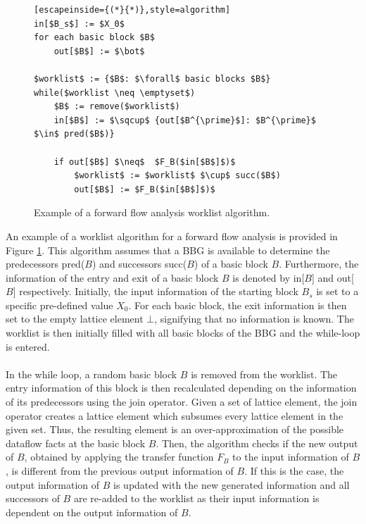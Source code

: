 \documentclass{kththesis}
\begin{document}
\clearpage
\begin{figure}[t]
    \centering
\begin{algorithmFrame}
\begin{lstlisting}[escapeinside={(*}{*)},style=algorithm]
in[$B_s$] := $X_0$
for each basic block $B$
    out[$B$] := $\bot$
    
$worklist$ := {$B$: $\forall$ basic blocks $B$}
while($worklist \neq \emptyset$)
    $B$ := remove($worklist$)
    in[$B$] := $\sqcup$ {out[$B^{\prime}$]: $B^{\prime}$ $\in$ pred($B$)}
    
    if out[$B$] $\neq$  $F_B($in[$B$]$)$
        $worklist$ := $worklist$ $\cup$ succ($B$)
        out[$B$] := $F_B($in[$B$]$)$
\end{lstlisting}
\end{algorithmFrame}
\caption[Example of a forward flow analysis worklist algorithm.]{Example of a forward flow analysis worklist algorithm.}
    \label{fig:WorklistAlgo}
\end{figure}
\noindent
An example of a worklist algorithm for a forward flow analysis is provided in Figure \ref{fig:WorklistAlgo}. This algorithm assumes that a BBG is available to determine the predecessors pred($B$) and successors succ($B$) of a basic block $B$. Furthermore, the information of the entry and exit of a basic block $B$ is denoted by in[$B$] and out[$B$] respectively. Initially, the input information of the starting block $B_s$ is set to a specific pre-defined value $X_0$. For each basic block, the exit information is then set to the empty lattice element $\bot$, signifying that no information is known. The worklist is then initially filled with all basic blocks of the BBG and the while-loop is entered.
\\ \\
In the while loop, a random basic block $B$ is removed from the worklist. The entry information of this block is then recalculated depending on the information of its predecessors using the join operator. Given a set of lattice element, the join operator creates a lattice element which subsumes every lattice element in the given set. Thus, the resulting element is an over-approximation of the possible dataflow facts at the basic block $B$. Then, the algorithm checks if the new output of $B$, obtained by applying the transfer function $F_B$ to the input information of $B$, is different from the previous output information of $B$. If this is the case, the output information of $B$ is updated with the new generated information and all successors of $B$ are re-added to the worklist as their input information is dependent on the output information of $B$.
\end{document}
